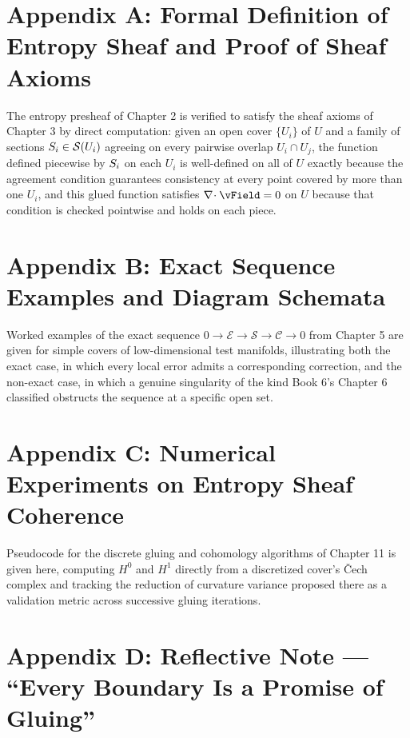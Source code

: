 \chapter*{Appendix A: Formal Definition of Entropy Sheaf and Proof of Sheaf Axioms}

The entropy presheaf of Chapter 2 is verified to satisfy the sheaf axioms of Chapter 3 by direct computation: given an open cover $\{U_i\}$ of $U$ and a family of sections $S_i \in \mathcal{S}(U_i)$ agreeing on every pairwise overlap $U_i \cap U_j$, the function defined piecewise by $S_i$ on each $U_i$ is well-defined on all of $U$ exactly because the agreement condition guarantees consistency at every point covered by more than one $U_i$, and this glued function satisfies $\diverg \vField = 0$ on $U$ because that condition is checked pointwise and holds on each piece.

\chapter*{Appendix B: Exact Sequence Examples and Diagram Schemata}

Worked examples of the exact sequence $0 \to \mathcal{E} \to \mathcal{S} \to \mathcal{C} \to 0$ from Chapter 5 are given for simple covers of low-dimensional test manifolds, illustrating both the exact case, in which every local error admits a corresponding correction, and the non-exact case, in which a genuine singularity of the kind Book 6's Chapter 6 classified obstructs the sequence at a specific open set.

\chapter*{Appendix C: Numerical Experiments on Entropy Sheaf Coherence}

Pseudocode for the discrete gluing and cohomology algorithms of Chapter 11 is given here, computing $H^0$ and $H^1$ directly from a discretized cover's Čech complex and tracking the reduction of curvature variance proposed there as a validation metric across successive gluing iterations.

\chapter*{Appendix D: Reflective Note --- ``Every Boundary Is a Promise of Gluing''}

